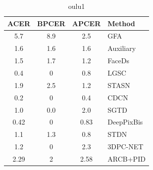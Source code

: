 \documentclass[journal]{IEEEtran}
\begin{document}
\begin{table}[h]
	\caption{oulu1 }
	\label{tab:oulu1}
	\centering
\begin{tabular}{|c|c|c|l|}
		\hline               
		ACER & BPCER      & APCER & Method              \\
	\hline 5.7     & 8.9        & 2.5 & \cite{tu2020learning}GFA     \\
	\hline 1.6     & 1.6        & 1.6  & \cite{liu2018learning} Auxiliary     \\
	\hline 1.5     & 1.7        & 1.2  & \cite{jourabloo2018face} FaceDs\\
	\hline 0.4     & 0          & 0.8  & \cite{feng2020learning} LGSC   \\
	\hline 1.9     & 2.5        & 1.2 & \cite{yang2019face} STASN   \\
	\hline 0.2     & 0          & 0.4  & \cite{yu2020searching} CDCN   \\
	\hline 1.0     & 0.0        & 2.0  & \cite{wang2020deep} SGTD   \\
	\hline 0.42 & 0          & 0.83& \cite{george2019deep} {DeepPixBis}\\
	\hline 1.1     & 1.3        & 0.8  & \cite{liu2020disentangling}STDN \\
	\hline 1.2     & 0          & 2.3 & \cite{li20203dpc}      3DPC-NET      \\
	\hline 2.29 & 2          & 2.58& ARCB+PID \\              
\hline         
\end{tabular}
\end{table}
\end{document}
